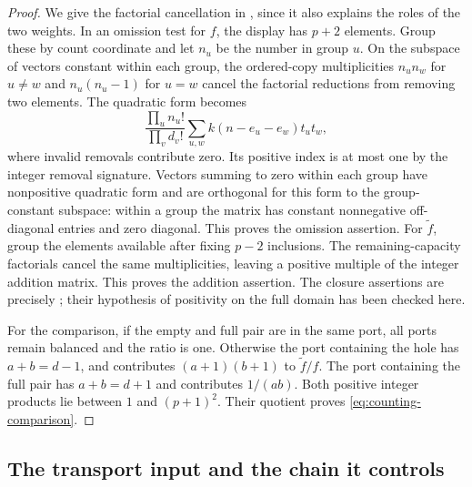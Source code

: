 \begin{proof}
We give the factorial cancellation in
\cite[Lemma~4.2, ``Signatures of the two lifts'']{CB}, since it also
explains the roles of the two weights.  In an omission test for $f$,
the display has $p+2$ elements.  Group these by count coordinate and let
$n_u$ be the number in group $u$.  On the subspace of vectors constant
within each group, the ordered-copy multiplicities $n_un_w$ for $u\ne w$
and $n_u(n_u-1)$ for $u=w$ cancel the factorial reductions from removing
two elements.  The quadratic form becomes
\[
 \frac{\prod_u n_u!}{\prod_v d_v!}
       \sum_{u,w}k(n-e_u-e_w)t_ut_w,
\]
where invalid removals contribute zero.  Its positive index is at most
one by the integer removal signature.  Vectors summing to zero within
each group have nonpositive quadratic form and are orthogonal for this
form to the group-constant subspace: within a group the matrix has
constant nonnegative off-diagonal entries and zero diagonal.  This
proves the omission assertion.  For $\widetilde f$, group the elements
available after fixing $p-2$ inclusions.  The remaining-capacity
factorials cancel the same multiplicities, leaving a positive multiple
of the integer addition matrix.  This proves the addition assertion.
The closure assertions are precisely
\cite[Lemma~4.1, ``Binary contractions'']{CB}; their hypothesis of
positivity on the full domain has been checked here.

For the comparison, if the empty and full pair are in the same port,
all ports remain balanced and the ratio is one.  Otherwise the port
containing the hole has $a+b=d-1$, and contributes $(a+1)(b+1)$
to $\widetilde f/f$.  The port containing the full pair has
$a+b=d+1$ and contributes $1/(ab)$.  Both positive integer products
lie between $1$ and $(p+1)^2$.  Their quotient proves
\eqref{eq:counting-comparison}.
\end{proof}

\subsection{The transport input and the chain it controls}

